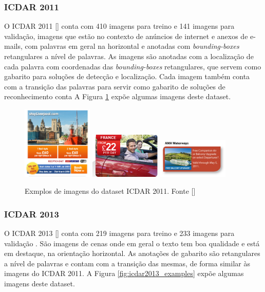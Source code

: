 \subsubsection{ICDAR 2011}\label{sec:datasets_icdar2011}
O ICDAR 2011 [] conta com 410 imagens para treino e 141 imagens para validação, imagens que estão no contexto de anúncios de internet e anexos de e-mails, com palavras em geral na horizontal e anotadas com \textit{bounding-boxes} retangulares a nível de palavras. As imagens são anotadas com a localização de cada palavra com coordenadas das \textit{bounding-boxes} retangulares, que servem como gabarito para soluções de detecção e localização. Cada imagem também conta com a transição das palavras para servir como gabarito de soluções de reconhecimento conta A Figura \ref{fig:icdar2011_examples} expõe algumas imagens deste dataset.

\begin{figure}
    \centering
    \includegraphics[width=0.3\textwidth]{figs/img_33.png}
    \includegraphics[width=0.3\textwidth]{figs/img_62.jpg}
    \includegraphics[width=0.3\textwidth]{figs/img_13.jpg}
    \caption{Exmplos de imagens do dataset ICDAR 2011. Fonte []}
        \label{fig:icdar2011_examples}
\end{figure}

\subsubsection{ICDAR 2013}\label{sec:datasets_icdar2013}
O ICDAR 2013 [] conta com 219 imagens para treino e 233 imagens para validação . São imagens de cenas onde em geral o texto tem boa qualidade e está em destaque, na orientação horizontal. As anotações de gabarito são retangulares a nível de palavras e contam com a transição das mesmas, de forma similar às imagens do ICDAR 2011. A Figura \ref{fig:icdar2013_examples} expõe algumas imagens deste dataset.

